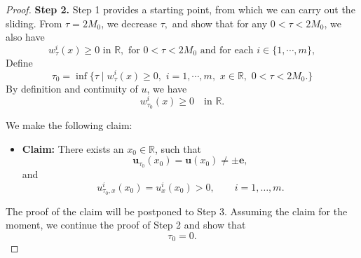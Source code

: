 \documentclass[11pt,twoside,reqno]{amsart}
\numberwithin{equation}{section}
\begin{document}
\begin{proof}
 {\bf{Step 2.}} Step 1 provides a starting point, from which we can carry out the sliding. From $\tau = 2M_0$, we decrease $\tau,$  and show that for any $0 <\tau< 2M_0$, we also have 
 \begin{equation}\label{step2}
w^{i}_{\tau}(x) \geq 0  \,\, \mbox{in}\,\, \mathbb{R},\,\, \mbox{for}\,\, 0<\tau <2M_0\,\, \mbox{and for each}\,\,i\in\{1,\cdots,m\},
\end{equation}
Define 
$$
\tau_0=\inf\{\tau \mid w^{i}_{\tau}(x) \geq  0,\,\, i=1,\cdots, m,\,\, x \in \mathbb{R},\,\, 0<\tau<2M_0.\}
$$
By definition and continuity of $u$, we have
\begin{equation}\label{eq. positivity by continuity}
w^i_{\tau_0}(x)\ge 0 \quad \text{in } \mathbb{R}.
\end{equation}

We make the following claim:
\begin{itemize}
    \item \textbf{Claim:} There exists an $x_{0}\in\mathbb{R}$, such that 
    \[
\mathbf u_{\tau_0}(x_0)=\mathbf u(x_0)\neq\pm\mathbf e,
\]
and
\[
u_{\tau_0,x}^i(x_0)=u_x^i(x_0)>0,
\qquad i=1,\ldots,m .
\]
\end{itemize}


The proof of the claim will be postponed to Step 3. Assuming the claim for
the moment, we continue the proof of Step 2 and show that
\[
\tau_0=0.
\]



\end{proof}
\end{document}
